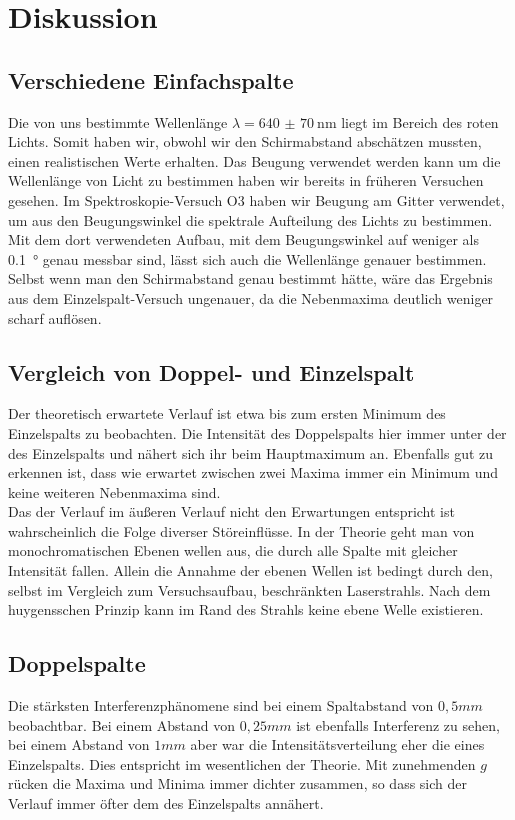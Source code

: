 \newpage
\section{Diskussion}
\subsection{Verschiedene Einfachspalte}
Die von uns bestimmte Wellenlänge $ \lambda = \SI{640(70)}{\nano\meter} $ liegt im Bereich des roten Lichts. Somit haben wir, obwohl wir den Schirmabstand abschätzen mussten, einen realistischen Werte erhalten. Das Beugung verwendet werden kann um die Wellenlänge von Licht zu bestimmen haben wir bereits in früheren Versuchen gesehen. Im Spektroskopie-Versuch O3 haben wir Beugung am Gitter verwendet, um aus den Beugungswinkel die spektrale Aufteilung des Lichts zu bestimmen. Mit dem dort verwendeten Aufbau, mit dem Beugungswinkel auf weniger als \SI{.1}{\degree} genau messbar sind, lässt sich auch die Wellenlänge genauer bestimmen.\\
Selbst wenn man den Schirmabstand genau bestimmt hätte, wäre das Ergebnis aus dem Einzelspalt-Versuch ungenauer, da die Nebenmaxima deutlich weniger scharf auflösen.

\subsection{Vergleich von Doppel- und Einzelspalt}
Der theoretisch erwartete Verlauf ist etwa bis zum ersten Minimum des Einzelspalts zu beobachten. Die Intensität des Doppelspalts hier immer unter der des Einzelspalts und nähert sich ihr beim Hauptmaximum an. Ebenfalls gut zu erkennen ist, dass wie erwartet zwischen zwei Maxima immer ein Minimum und keine weiteren Nebenmaxima sind.\\
Das der Verlauf im äußeren Verlauf nicht den Erwartungen entspricht ist wahrscheinlich die Folge diverser Störeinflüsse. In der Theorie geht man von monochromatischen Ebenen wellen aus, die durch alle Spalte mit gleicher Intensität fallen. Allein die Annahme der ebenen Wellen ist bedingt durch den, selbst im Vergleich zum Versuchsaufbau, beschränkten Laserstrahls. Nach dem huygensschen Prinzip kann im Rand des Strahls keine ebene Welle existieren. 
\subsection{Doppelspalte}
Die stärksten Interferenzphänomene sind bei einem Spaltabstand von $ 0,5mm $ beobachtbar. Bei einem Abstand von $ 0,25mm $ ist ebenfalls Interferenz zu sehen, bei einem Abstand von $ 1mm $ aber war die Intensitätsverteilung eher die eines Einzelspalts. Dies entspricht im wesentlichen der Theorie. Mit zunehmenden $ g $ rücken die Maxima und Minima immer dichter zusammen, so dass sich der Verlauf immer öfter dem des Einzelspalts annähert.
